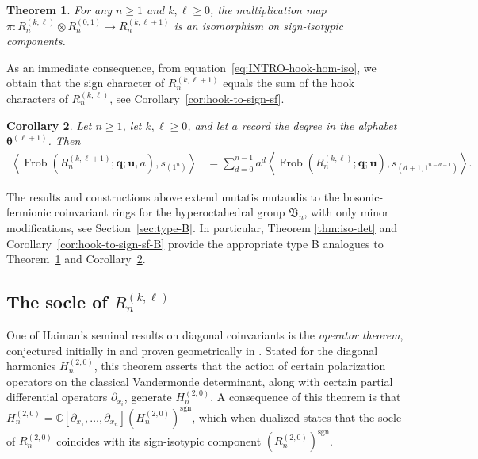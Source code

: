 \documentclass[11pt, reqno]{amsart}
\newtheorem{introthm}{Theorem}
\newtheorem{introcor}[introthm]{Corollary}
\theoremstyle{definition}
\theoremstyle{remark}
\numberwithin{equation}{section}
\newcommand{\0}{\emptyset}
\newcommand{\C}{\mathbb{C}}
\DeclareMathOperator{\Frob}{Frob}
\DeclareMathOperator{\sgn}{sgn}
\begin{document}
\begin{introthm}\label{thm:INTRO iso-sign}
    For any $n\geq 1$ and $k, \ell \geq 0$, the multiplication map $\pi: R_n^{(k,\ell)} \otimes R_n^{(0,1)} \to R_n^{(k,\ell+1)}$ is an isomorphism on sign-isotypic components. 
\end{introthm}

As an immediate consequence, from equation~\eqref{eq:INTRO-hook-hom-iso}, 
we obtain that the sign character of $R_n^{(k,\ell+1)}$ equals 
the sum of the hook characters of $R_n^{(k,\ell)}$, see Corollary~\ref{cor:hook-to-sign-sf}.

\begin{introcor}\label{cor:INTRO hook-to-sign-sf}
Let $n\geq 1$, let $k,\ell \geq 0$, and let $a$ record the degree in the alphabet $\bm{\theta}^{(\ell+1)}$. 
    Then
    \begin{align*}
        \left\langle \Frob(R_n^{(k,\ell+1)}; \mathbf{q};\mathbf{u}, a), s_{(1^n)} \right\rangle
   &= \sum_{d=0}^{n-1} a^d \left\langle \Frob(R_n^{(k,\ell)}; \mathbf{q};\mathbf{u}), s_{(d+1,1^{n-d-1})}\right\rangle.
    \end{align*}
\end{introcor}

The results and constructions above extend mutatis mutandis to 
the bosonic-fermionic coinvariant rings for the hyperoctahedral group $\mathfrak{B}_n$, 
with only minor modifications, see Section~\ref{sec:type-B}. 
In particular, Theorem \ref{thm:iso-det} and Corollary~\ref{cor:hook-to-sign-sf-B} provide the appropriate type B analogues to Theorem~\ref{thm:INTRO iso-sign} and Corollary~\ref{cor:INTRO hook-to-sign-sf}. 

\subsection{The socle of $R_n^{(k,\ell)}$} One of Haiman's seminal results on diagonal coinvariants is the 
\emph{operator theorem}, conjectured initially in \cite{Haiman1994} and proven geometrically in \cite{Haiman2002}. 
Stated for the diagonal harmonics $H_n^{(2,0)}$, this theorem asserts that 
the action of certain polarization operators on the classical Vandermonde determinant, 
along with certain partial differential operators $\partial_{x_i}$, generate $H_n^{(2,0)}$. 
A consequence of this theorem is that $H_n^{(2,0)} = \C[\partial_{x_1},\ldots,\partial_{x_n}]\left(H_n^{(2,0)}\right)^{\sgn}$, 
which when dualized
states that the socle of $R_n^{(2,0)}$ coincides with its sign-isotypic component $\left(R_n^{(2,0)}\right)^{\sgn}$.
\end{document}

